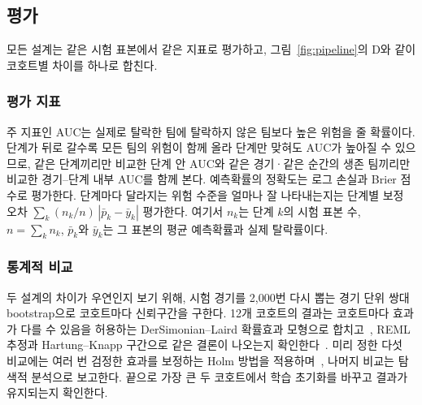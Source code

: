 \subsection{평가}
\label{sec:method:evaluation}
모든 설계는 같은 시험 표본에서 같은 지표로 평가하고, 그림~\ref{fig:pipeline}의 D와 같이 코호트별 차이를 하나로 합친다.

\subsubsection{평가 지표}
주 지표인 AUC는 실제로 탈락한 팀에 탈락하지 않은 팀보다 높은 위험을 줄 확률이다.
단계가 뒤로 갈수록 모든 팀의 위험이 함께 올라 단계만 맞혀도 AUC가 높아질 수 있으므로, 같은 단계끼리만 비교한 단계 안 AUC와 같은 경기·같은 순간의 생존 팀끼리만 비교한 경기--단계 내부 AUC를 함께 본다. 
예측확률의 정확도는 로그 손실과 Brier 점수로 평가한다.
단계마다 달라지는 위험 수준을 얼마나 잘 나타내는지는 단계별 보정 오차 $\sum_{k}(n_k/n)\,|\bar{p}_k-\bar{y}_k|$ 평가한다. 여기서 $n_k$는 단계 $k$의 시험 표본 수, $n=\sum_k n_k$, $\bar{p}_k$와 $\bar{y}_k$는 그 표본의 평균 예측확률과 실제 탈락률이다.

\subsubsection{통계적 비교}
두 설계의 차이가 우연인지 보기 위해, 시험 경기를 2,000번 다시 뽑는 경기 단위 쌍대 bootstrap으로 코호트마다 신뢰구간을 구한다.
12개 코호트의 결과는 코호트마다 효과가 다를 수 있음을 허용하는 DerSimonian--Laird 확률효과 모형으로 합치고~\cite{DerSimonian86}, REML 추정과 Hartung--Knapp 구간으로 같은 결론이 나오는지 확인한다~\cite{HartungKnapp01}.
미리 정한 다섯 비교에는 여러 번 검정한 효과를 보정하는 Holm 방법을 적용하며~\cite{Holm79}, 나머지 비교는 탐색적 분석으로 보고한다.
끝으로 가장 큰 두 코호트에서 학습 초기화를 바꾸고  결과가 유지되는지 확인한다.
